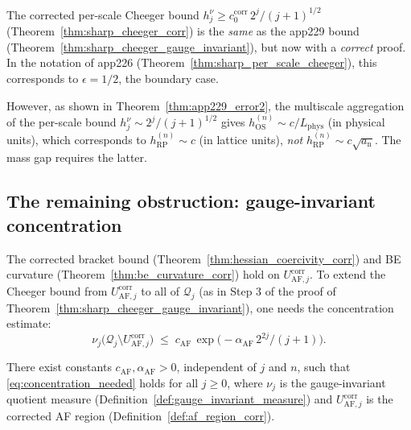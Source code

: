 \begin{remark}[The corrected bound is still at $\epsilon=1/2$]
\label{rem:corrected_still_half}
The corrected per-scale Cheeger bound
$h_{j}^{\nu}\ge c_{0}^{\mathrm{corr}}\,2^{j}/(j+1)^{1/2}$
(Theorem~\ref{thm:sharp_cheeger_corr}) is the \emph{same} as the
app229 bound (Theorem~\ref{thm:sharp_cheeger_gauge_invariant}),
but now with a \emph{correct} proof. In the notation of app226
(Theorem~\ref{thm:sharp_per_scale_cheeger}), this corresponds to
$\epsilon=1/2$, the boundary case.

However, as shown in Theorem~\ref{thm:app229_error2}, the
multiscale aggregation of the per-scale bound
$h_{j}^{\nu}\sim 2^{j}/(j+1)^{1/2}$ gives
$h_{\mathrm{OS}}^{(n)}\sim c/L_{\mathrm{phys}}$ (in physical
units), which corresponds to $h_{\mathrm{RP}}^{(n)}\sim c$ (in
lattice units), \emph{not} $h_{\mathrm{RP}}^{(n)}\sim c\sqrt{a_{
\mathrm{n}}}$. The mass gap requires the latter.
\end{remark}

\subsection{The remaining obstruction: gauge-invariant concentration}
\label{ssec:app230_concentration}

The corrected bracket bound (Theorem~\ref{thm:hessian_coercivity_corr})
and BE curvature (Theorem~\ref{thm:be_curvature_corr}) hold on
$U_{\mathrm{AF},j}^{\mathrm{corr}}$. To extend the Cheeger bound
from $U_{\mathrm{AF},j}^{\mathrm{corr}}$ to all of $\mathcal{Q}_{j}$
(as in Step 3 of the proof of
Theorem~\ref{thm:sharp_cheeger_gauge_invariant}), one needs the
concentration estimate:
\begin{equation}
\label{eq:concentration_needed}
  \nu_{j}\bigl(\mathcal{Q}_{j}\setminus
  U_{\mathrm{AF},j}^{\mathrm{corr}}\bigr)
  \;\le\;c_{\mathrm{AF}}\,\exp\!\bigl(-\alpha_{\mathrm{AF}}\,
  2^{2j}/(j+1)\bigr).
\end{equation}

\begin{hypothesis}
\label{hyp:gauge_invariant_concentration}
There exist constants $c_{\mathrm{AF}},\alpha_{\mathrm{AF}}>0$,
independent of $j$ and $n$, such that
\eqref{eq:concentration_needed} holds for all $j\ge 0$, where
$\nu_{j}$ is the gauge-invariant quotient measure
(Definition~\ref{def:gauge_invariant_measure}) and
$U_{\mathrm{AF},j}^{\mathrm{corr}}$ is the corrected AF region
(Definition~\ref{def:af_region_corr}).
\end{hypothesis}

